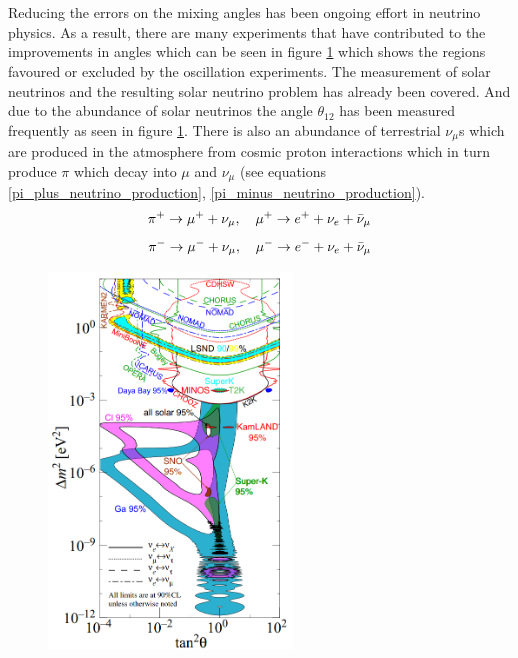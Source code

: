 \\\\Reducing the errors on the mixing angles has been ongoing effort in neutrino physics. As a result, there are many experiments that have contributed to the improvements in angles which can be seen in figure \ref{neutrino_angles_experiments_variations} 
 which shows the regions favoured or excluded by the oscillation experiments. The measurement of solar neutrinos and the resulting solar neutrino problem has already been covered. And due to the abundance of solar neutrinos the angle $\theta_{12}$ has been measured frequently as seen in figure \ref{neutrino_angles_experiments_variations}. There is also an abundance of terrestrial $\nu_\mu$s which are produced in the atmosphere from cosmic proton interactions which in turn produce $\pi$ which decay into $\mu$ and $\nu_\mu$ \cite{griffiths2008neutrinoOscillations} (see equations \ref{pi_plus_neutrino_production}, \ref{pi_minus_neutrino_production}).
\begin{equation}
    \pi^+ \rightarrow \mu^+ + \nu_\mu,\quad \mu^+ \rightarrow e^+ + \nu_e + \Bar{\nu}_\mu 
    \label{pi_plus_neutrino_production}
\end{equation}
\begin{equation}
    \pi^- \rightarrow \mu^- + \nu_\mu, \quad \mu^- \rightarrow e^- + \nu_e + \Bar{\nu}_\mu 
    \label{pi_minus_neutrino_production}
\end{equation}
\begin{figure}[!h]
 \centering
 \includegraphics[height=100mm]{Chapter1/Figs/Raster/neutrino_angles_experiments_variations.png} %
 \label{neutrino_angles_experiments_variations}
\end{figure}
